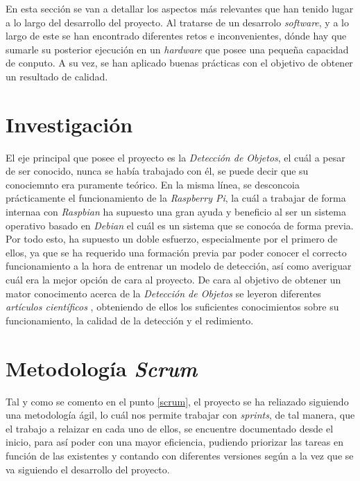 
En esta sección se van a detallar los aspectos más relevantes que han tenido lugar a lo largo del desarrollo del proyecto. Al tratarse de un desarrolo \textit{software}, y a lo largo de este se han encontrado diferentes retos e inconvenientes, dónde hay que sumarle su posterior ejecución en un \textit{hardware} que posee una pequeña capacidad de conputo. A su vez, se han aplicado buenas prácticas con el objetivo de obtener un resultado de calidad.

\section{Investigación}
El eje principal que posee el proyecto es la \textit{Detección de Objetos}, el cuál a pesar de ser conocido, nunca se había trabajado con él, se puede decir que su conociemnto era puramente teórico. En la misma línea, se desconcoia prácticamente el funcionamiento de la \textit{Raspberry Pi}, la cuál a trabajar de forma internaa con \textit{Raspbian} ha supuesto
una gran ayuda y beneficio al ser un sistema operativo basado en \textit{Debian} el cuál es un sistema que se conocóa de forma previa.
Por todo esto, ha supuesto un doble esfuerzo, especialmente por el primero de ellos, ya que se ha requerido una formación previa par poder conocer el correcto funcionamiento a la hora de entrenar un modelo de detección, así como averiguar cuál era la mejor opción de cara al proyecto.
De cara al objetivo de obtener un mator conocimento acerca de la \textit{Detección de Objetos} se leyeron diferentes \textit{artículos científicos} \cite{Pathak2018,Yang2017, Wu2020}, obteniendo de ellos los suficientes conocimientos sobre su funcionamiento, la calidad de la detección y el redimiento.

\section{Metodología \textit{Scrum}}
Tal y como se comento en el punto \ref{scrum}, el proyecto se ha reliazado siguiendo una metodología ágil, lo cuál nos permite trabajar con \textit{sprints}, de tal manera, que el trabajo a relaizar en cada uno de ellos, se encuentre documentado desde el inicio, para así poder con una mayor eficiencia, pudiendo priorizar las tareas en función de las existentes y contando con diferentes versiones según a la vez que se va siguiendo el desarrollo del proyecto.

